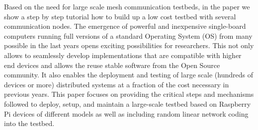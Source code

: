 Based on the need for large scale mesh communication testbeds, in the paper we show a step by step tutorial how to build up a low cost testbed with several communication nodes. The emergence of powerful and inexpensive single-board computers running full versions of a standard Operating System (OS) from many possible in the last years opens exciting possibilities for researchers. This not only allows to seamlessly develop implementations that are compatible with higher end devices and allows the reuse stable software from the Open Source community. It also enables the deployment and testing of large scale (hundreds of devices or more) distributed systems at a fraction of the cost necessary in previous years. This paper focuses on providing the critical steps and mechanisms followed to deploy, setup, and maintain a large-scale testbed based on Raspberry Pi devices of different models as well as including random linear network coding into the testbed.

%


